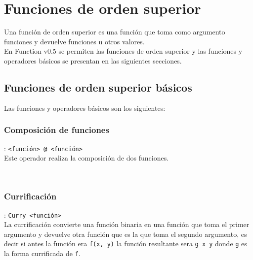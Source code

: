 
\titlespacing{\subsection}{0pt}{10pt}{0pt}

\chapter{Funciones de orden superior}
   Una función de orden superior es una función que toma como argumento funciones y devuelve funciones u otros valores.
   \\
   
   En Function v0.5 se permiten las funciones de orden superior y las funciones y operadores básicos se presentan en las siguientes secciones.
   
   \section{Funciones de orden superior básicos}
      Las funciones y operadores básicos son los siguientes:
      
      \subsection*{Composición de funciones}: \texttt{<función> @ <función>}\\
      Este operador realiza la composición de dos funciones.
      
      \begin{fxcode}
         \\
      \end{fxcode}
      
      \subsection*{Currificación}: \texttt{Curry <función>}\\
      La currificación convierte una función binaria en una función que toma el primer argumento y devuelve otra función que es la que toma el segundo argumento, es decir si antes la función era \texttt{f(x, y)} la función resultante sera \texttt{g x y} donde \texttt{g} es la forma currificada de \texttt{f}.
      

